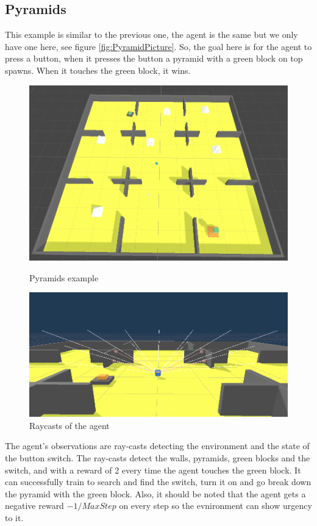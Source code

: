 \documentclass[a4paper, 12pt]{book}
\begin{document}
\subsection{Pyramids}

This example is similar to the previous one, the agent is the same but we only have one here, see figure \ref{fig:PyramidPicture}. So, the goal here is for the agent to press a button, when it presses the button a pyramid with a green block on top spawns. When it touches the green block, it wins.

\begin{figure}[ht]
  \includegraphics[width=\linewidth]{Images/PyramidsExample.png}
  \caption{Pyramids example \cite{MLAgents}}\label{fig:PyramidPicture}
\endminipage\hfill
{}
  \includegraphics[width=\linewidth]{Images/PyramidsRaycast.png}
  \caption{Raycasts of the agent}\label{fig:PyramidRaycasts}
\endminipage\hfill
\label{PyradmidsExample}
\end{figure}

The agent's observations are ray-casts detecting the environment and the state of the button switch. The ray-casts detect the walls, pyramids, green blocks and the switch, and with a reward of 2 every time the agent touches the green block. It can successfully train to search and find the switch, turn it on and go break down the pyramid with the green block. Also, it should be noted that the agent gets a negative reward $ -1 / MaxStep $ on every step so the evnironment can show urgency to it.
\end{document}
